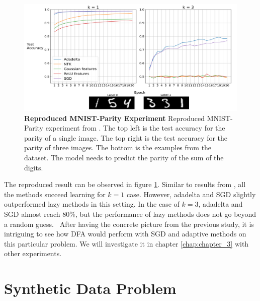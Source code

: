 \documentclass[a4paper, nobind]{templates/ociamthesis}
\begin{document}
\begin{figure}

{\centering \includegraphics[width=1\linewidth]{figures/2_k13_SGD_ada_BP_reproduced} 

}

\caption[Reproduced MNIST-Parity Experiment]{\textbf{Reproduced MNIST-Parity Experiment} \newline Reproduced MNIST-Parity experiment from \cite{DBLP:journals/corr/abs-2002-07400}. The top left is the test accuracy for the parity of a single image. The top right is the test accuracy for the parity of three images. The bottom is the examples from the dataset. The model needs to predict the parity of the sum of the digits.}\label{fig:MNISTparity}
\end{figure}

\noindent The reproduced result can be observed in figure \ref{fig:MNISTparity}. Similar to results from \cite{DBLP:journals/corr/abs-2002-07400}, all the methods succeed learning for \(k=1\) case. However, adadelta and SGD slightly outperformed lazy methods in this setting. In the case of \(k=3\), adadelta and SGD almost reach \(80\%\), but the performance of lazy methods does not go beyond a random guess.~
After having the concrete picture from the previous study, it is intriguing to see how DFA would perform with SGD and adaptive methods on this particular problem. We will investigate it in chapter \ref{chap:chapter_3} with other experiments.

\hypertarget{synthetic-data-problem}{%
\section{Synthetic Data Problem}\label{synthetic-data-problem}}
\end{document}
